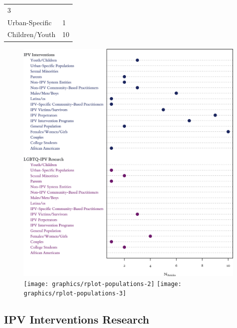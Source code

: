 \documentclass[]{tufte-handout}
\begin{document}
\begin{longtable}[]{@{}ll@{}}
\begin{minipage}[t]{0.21\columnwidth}
3\strut
\end{minipage}\tabularnewline
\begin{minipage}[t]{0.59\columnwidth}\raggedright\strut
Urban-Specific\strut
\end{minipage} & \begin{minipage}[t]{0.21\columnwidth}\raggedright\strut
1\strut
\end{minipage}\tabularnewline
\begin{minipage}[t]{0.59\columnwidth}\raggedright\strut
Children/Youth\strut
\end{minipage} & \begin{minipage}[t]{0.21\columnwidth}\raggedright\strut
10\strut
\end{minipage}\tabularnewline
\bottomrule
\end{longtable}

\begin{figure}
\includegraphics[width=\linewidth]{graphics/rplot-populations-1} \texttt{[image: graphics/rplot-populations-2]} \texttt{[image: graphics/rplot-populations-3]} \end{figure}

\newpage

\subsection{IPV Interventions
Research}\label{ipv-interventions-research}
\end{document}
